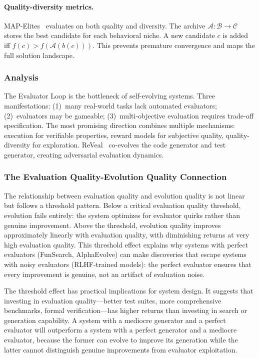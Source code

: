 \paragraph{Quality-diversity metrics.}
MAP-Elites~\citep{mouret2015mapelites} evaluates on both quality and diversity. The archive $\mathcal{A}: \mathcal{B} \rightarrow \mathcal{C}$ stores the best candidate for each behavioral niche. A new candidate $c$ is added iff $f(c) > f(\mathcal{A}(b(c)))$. This prevents premature convergence and maps the full solution landscape.

\subsubsection{Analysis}

The Evaluator Loop is the bottleneck of self-evolving systems. Three manifestations: (1)~many real-world tasks lack automated evaluators; (2)~evaluators may be gameable; (3)~multi-objective evaluation requires trade-off specification. The most promising direction combines multiple mechanisms: execution for verifiable properties, reward models for subjective quality, quality-diversity for exploration. ReVeal~\citep{jin2026reveal} co-evolves the code generator and test generator, creating adversarial evaluation dynamics.

\subsubsection{The Evaluation Quality-Evolution Quality Connection}

The relationship between evaluation quality and evolution quality is not linear but follows a threshold pattern. Below a critical evaluation quality threshold, evolution fails entirely: the system optimizes for evaluator quirks rather than genuine improvement. Above the threshold, evolution quality improves approximately linearly with evaluation quality, with diminishing returns at very high evaluation quality. This threshold effect explains why systems with perfect evaluators (FunSearch, AlphaEvolve) can make discoveries that escape systems with noisy evaluators (RLHF-trained models): the perfect evaluator ensures that every improvement is genuine, not an artifact of evaluation noise.

The threshold effect has practical implications for system design. It suggests that investing in evaluation quality---better test suites, more comprehensive benchmarks, formal verification---has higher returns than investing in search or generation capability. A system with a mediocre generator and a perfect evaluator will outperform a system with a perfect generator and a mediocre evaluator, because the former can evolve to improve its generation while the latter cannot distinguish genuine improvements from evaluator exploitation.

